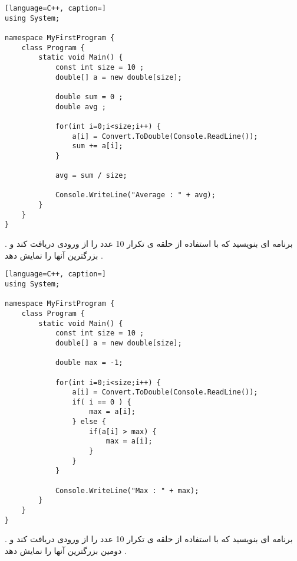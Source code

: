 \documentclass[12pt]{article}
\begin{document}
\begin{latin}
\begin{lstlisting}[language=C++, caption=]
using System;

namespace MyFirstProgram {
	class Program {
		static void Main() {
			const int size = 10 ;
			double[] a = new double[size];
			
			double sum = 0 ;
			double avg ;
			
			for(int i=0;i<size;i++) {
				a[i] = Convert.ToDouble(Console.ReadLine());
				sum += a[i];
			}
			
			avg = sum / size;
	
			Console.WriteLine("Average : " + avg);
		}
	}
}
\end{lstlisting}
\end{latin}








\newpage

 . برنامه ای بنویسید که با استفاده از حلقه ی تکرار 10 عدد را از ورودی دریافت کند و بزرگترین آنها را نمایش دهد .






\begin{latin}
\begin{lstlisting}[language=C++, caption=]
using System;

namespace MyFirstProgram {
	class Program {
		static void Main() {
			const int size = 10 ;
			double[] a = new double[size];
			
			double max = -1;
			
			for(int i=0;i<size;i++) {
				a[i] = Convert.ToDouble(Console.ReadLine());
				if( i == 0 ) {
					max = a[i];
				} else {
					if(a[i] > max) {
						max = a[i];
					}
				}
			}
	
			Console.WriteLine("Max : " + max);
		}
	}
}
\end{lstlisting}
\end{latin}







\newpage

 . برنامه ای بنویسید که با استفاده از حلقه ی تکرار 10 عدد را از ورودی دریافت کند و دومین بزرگترین آنها را نمایش دهد .
\end{document}

